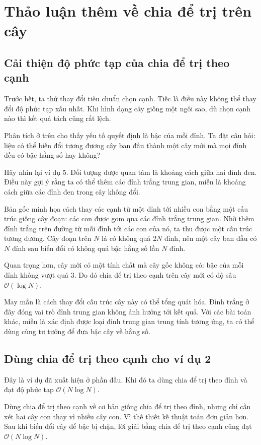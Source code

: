 \documentclass[11pt]{article}
\newcommand{\Oh}{\mathcal{O}}
\begin{document}
\section{Thảo luận thêm về chia để trị trên cây}

\subsection{Cải thiện độ phức tạp của chia để trị theo cạnh}

Trước hết, ta thử thay đổi tiêu chuẩn chọn cạnh. Tiếc là điều này không thể
thay đổi độ phức tạp xấu nhất. Khi hình dạng cây giống một ngôi sao, dù chọn
cạnh nào thì kết quả tách cũng rất lệch.

Phân tích ở trên cho thấy yếu tố quyết định là bậc của mỗi đỉnh. Ta đặt câu
hỏi: liệu có thể biến đổi tương đương cây ban đầu thành một cây mới mà mọi
đỉnh đều có bậc hằng số hay không?

Hãy nhìn lại ví dụ 5. Đối tượng được quan tâm là khoảng cách giữa hai đỉnh
đen. Điều này gợi ý rằng ta có thể thêm các đỉnh trắng trung gian, miễn là
khoảng cách giữa các đỉnh đen trong cây không đổi.

Bản gốc minh họa cách thay các cạnh từ một đỉnh tới nhiều con bằng một cấu
trúc giống cây đoạn: các con được gom qua các đỉnh trắng trung gian. Nhờ thêm
đỉnh trắng trên đường từ mỗi đỉnh tới các con của nó, ta thu được một cấu trúc
tương đương. Cây đoạn trên \(N\) lá có không quá \(2N\) đỉnh, nên một cây ban
đầu có \(N\) đỉnh sau biến đổi có không quá bậc hằng số lần \(N\) đỉnh.

Quan trọng hơn, cây mới có một tính chất mà cây gốc không có: bậc của mỗi
đỉnh không vượt quá \(3\). Do đó chia để trị theo cạnh trên cây mới có độ sâu
\(\Oh(\log N)\).

May mắn là cách thay đổi cấu trúc cây này có thể tổng quát hóa. Đỉnh trắng ở
đây đóng vai trò đỉnh trung gian không ảnh hưởng tới kết quả. Với các bài
toán khác, miễn là xác định được loại đỉnh trung gian trung tính tương ứng, ta
có thể dùng cùng tư tưởng để đưa bậc cây về hằng số.

\subsection{Dùng chia để trị theo cạnh cho ví dụ 2}

Đây là ví dụ đã xuất hiện ở phần đầu. Khi đó ta dùng chia để trị theo đỉnh và
đạt độ phức tạp \(\Oh(N\log N)\).

Dùng chia để trị theo cạnh về cơ bản giống chia để trị theo đỉnh, nhưng chỉ
cần xét hai cây con thay vì nhiều cây con. Vì thế thiết kế thuật toán đơn
giản hơn. Sau khi biến đổi cây để bậc bị chặn, lời giải bằng chia để trị theo
cạnh cũng đạt \(\Oh(N\log N)\).
\end{document}
